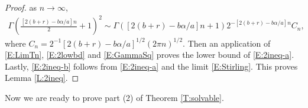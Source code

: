 \documentclass[a4paper,11pt]{article}
\numberwithin{equation}{section}
\numberwithin{equation}{section}
\theoremstyle{plain}
\theoremstyle{definition}
\begin{document}
\begin{proof}
  as $n\to \infty$,
  \begin{align} \label{E:GammaSq}
    \Gamma\left( \frac{[2(b + r ) -b \alpha / a]n}{2} +1 \right)^2  \sim
    \Gamma\left( [2(b + r ) -b \alpha / a]n +1 \right)2^{- [2(b + r ) -b \alpha / a]n}C_n,
  \end{align}
  where $C_n = 2^{-1}[2(b + r ) -b \alpha / a]^{1/2}(2 \pi n )^{1/2}$. Then an application of
  \eqref{E:LimTn}, \eqref{E:2lowbd} and \eqref{E:GammaSq} proves the lower bound of
  \eqref{E:2ineq-a}. Lastly, \eqref{E:2ineq-b} follows from \eqref{E:2ineq-a} and the limit
  \eqref{E:Stirling}. This proves Lemma \ref{L:2ineq}.
\end{proof}

Now we are ready to prove part (2) of Theorem \ref{T:solvable}.
\end{document}
